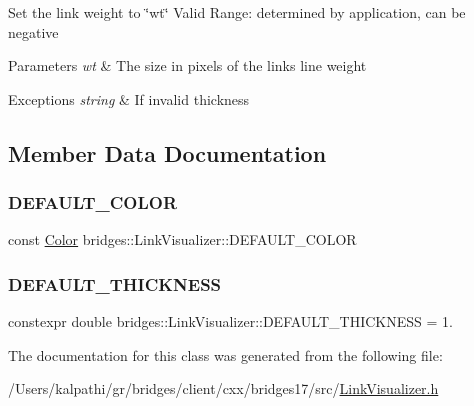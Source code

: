 Set the link weight to \char`\"{}wt\char`\"{} Valid Range\+: determined by application, can be negative


\begin{DoxyParams}{Parameters}
{\em wt} & The size in pixels of the link\textquotesingle{}s line weight \\
\hline
\end{DoxyParams}

\begin{DoxyExceptions}{Exceptions}
{\em string} & If invalid thickness \\
\hline
\end{DoxyExceptions}


\subsection{Member Data Documentation}
\mbox{\label{classbridges_1_1_link_visualizer_a7698ad5b243041377d81152a339d1282}} 
\subsubsection{\texorpdfstring{D\+E\+F\+A\+U\+L\+T\+\_\+\+C\+O\+L\+OR}{DEFAULT\_COLOR}}
{\footnotesize\ttfamily const \mbox{\hyperlink{classbridges_1_1_color}{Color}} bridges\+::\+Link\+Visualizer\+::\+D\+E\+F\+A\+U\+L\+T\+\_\+\+C\+O\+L\+OR\hspace{0.3cm}{\ttfamily [static]}}

\mbox{\label{classbridges_1_1_link_visualizer_ab790c33080c769008114db34d5ec8950}} 
\subsubsection{\texorpdfstring{D\+E\+F\+A\+U\+L\+T\+\_\+\+T\+H\+I\+C\+K\+N\+E\+SS}{DEFAULT\_THICKNESS}}
{\footnotesize\ttfamily constexpr double bridges\+::\+Link\+Visualizer\+::\+D\+E\+F\+A\+U\+L\+T\+\_\+\+T\+H\+I\+C\+K\+N\+E\+SS = 1.\hspace{0.3cm}{\ttfamily [static]}}



The documentation for this class was generated from the following file\+:\begin{DoxyCompactItemize}
\item 
/\+Users/kalpathi/gr/bridges/client/cxx/bridges17/src/\mbox{\hyperlink{_link_visualizer_8h}{Link\+Visualizer.\+h}}\end{DoxyCompactItemize}

